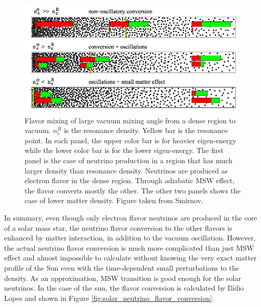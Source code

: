 \begin{figure}
\centering
\includegraphics[width=\columnwidth]{chapters/assets/solar/msw_and_density.png}
\caption{Flavor mixing of large vacuum mixing angle from a dense region to vacuum. $n_e^R$ is the resonance density. Yellow bar is the resonance point. In each panel, the upper color bar is for heavier eigen-energy while the lower color bar is for the lower eigen-energy. The first panel is the case of neutrino production in a region that has much larger density than resonance density. Neutrinos are produced as electron flavor in the dense region. Through adiabatic MSW effect, the flavor converts mostly the other. The other two panels shows the case of lower matter density. Figure taken from Smirnov.\cite{Smirnov2003}}
\label{fig:msw_and_density}
\end{figure}



In summary, even though only electron flavor neutrinos are produced in the core of a solar mass star, the neutrino flavor conversion to the other flavors is enhanced by matter interaction, in addition to the vacuum oscillation. However, the actual neutrino flavor conversion is much more complicated than just MSW effect and almost impossible to calculate without knowing the very exact matter profile of the Sun even with the time-dependent small perturbations to the density. As an approximation, MSW transition is good enough for the solar neutrinos.\cite{Lopes2013a} In the case of the sun, the flavor conversion is calculated by Ilídio Lopes and shown in Figure \ref{fig:solar_neutrino_flavor_conversion}.\cite{Lopes2013}

